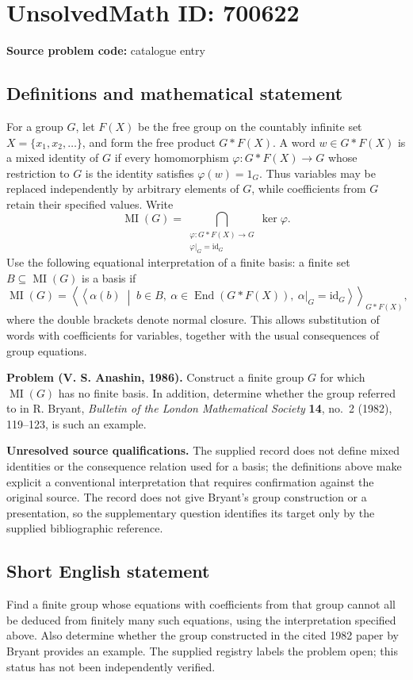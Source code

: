 \documentclass[11pt]{article}
\begin{document}
\section*{UnsolvedMath ID: 700622}
\textbf{Source problem code:} catalogue entry
\subsection{Definitions and mathematical statement}
For a group \(G\), let \(F(X)\) be the free group on the countably infinite set \(X=\{x_1,x_2,\ldots\}\), and form the free product \(G*F(X)\). A word \(w\in G*F(X)\) is a mixed identity of \(G\) if every homomorphism \(\varphi:G*F(X)\to G\) whose restriction to \(G\) is the identity satisfies \(\varphi(w)=1_G\). Thus variables may be replaced independently by arbitrary elements of \(G\), while coefficients from \(G\) retain their specified values. Write
\[
\operatorname{MI}(G)=\bigcap_{\substack{\varphi:G*F(X)\to G\\ \varphi|_G=\mathrm{id}_G}}\ker\varphi.
\]
Use the following equational interpretation of a finite basis: a finite set \(B\subseteq\operatorname{MI}(G)\) is a basis if
\[
\operatorname{MI}(G)=\left\langle\!\left\langle
\alpha(b)\;\middle|\; b\in B,\ \alpha\in\operatorname{End}(G*F(X)),\ \alpha|_G=\mathrm{id}_G
\right\rangle\!\right\rangle_{G*F(X)},
\]
where the double brackets denote normal closure. This allows substitution of words with coefficients for variables, together with the usual consequences of group equations.

\textbf{Problem (V. S. Anashin, 1986).} Construct a finite group \(G\) for which \(\operatorname{MI}(G)\) has no finite basis. In addition, determine whether the group referred to in R. Bryant, \emph{Bulletin of the London Mathematical Society} \textbf{14}, no.~2 (1982), 119--123, is such an example.

\textbf{Unresolved source qualifications.} The supplied record does not define mixed identities or the consequence relation used for a basis; the definitions above make explicit a conventional interpretation that requires confirmation against the original source. The record does not give Bryant's group construction or a presentation, so the supplementary question identifies its target only by the supplied bibliographic reference.
\subsection{Short English statement}
Find a finite group whose equations with coefficients from that group cannot all be deduced from finitely many such equations, using the interpretation specified above. Also determine whether the group constructed in the cited 1982 paper by Bryant provides an example. The supplied registry labels the problem open; this status has not been independently verified.
\end{document}
